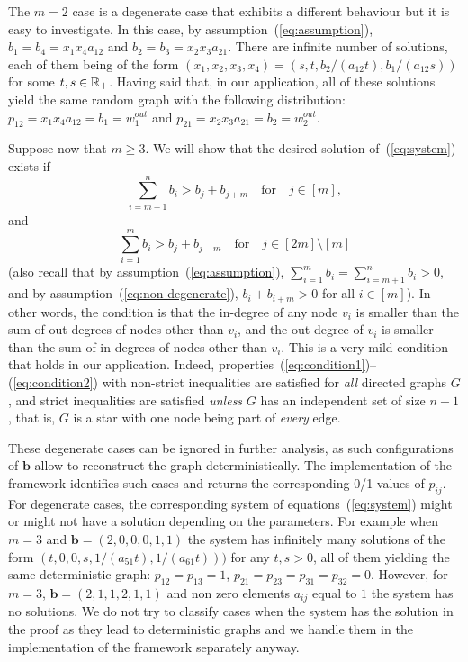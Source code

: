 \medskip

The $m=2$ case is a degenerate case that exhibits a different behaviour but it is easy to investigate. In this case, by assumption~(\ref{eq:assumption}), $b_1 = b_4 = x_1 x_4 a_{12}$ and $b_2 = b_3 = x_2 x_3 a_{21}$. There are infinite number of solutions, each of them being of the form $(x_1, x_2, x_3, x_4) = (s, t, b_2/(a_{12}t), b_1/(a_{12}s))$ for some $t, s \in {\mathbb R}_+$. Having said that, in our application, all of these solutions yield the same random graph with the following distribution: $p_{12} = x_1 x_4 a_{12} = b_1 = w^{out}_1$ and $p_{21} = x_2 x_3 a_{21} = b_2 = w^{out}_2$.

\medskip

Suppose now that $m \ge 3$. We will show that the desired solution of~(\ref{eq:system}) exists if
\begin{equation}\label{eq:condition1}
\sum_{i=m+1}^nb_i > b_j + b_{j+m} \quad \text{for} \quad j\in[m],
\end{equation}
and
\begin{equation}\label{eq:condition2}
\sum_{i=1}^mb_i > b_j + b_{j-m} \quad \text{for} \quad j\in[2m] \setminus [m]
\end{equation}
(also recall that by assumption~(\ref{eq:assumption}), $\sum_{i=1}^{m}b_i=\sum_{i=m+1}^{n}b_i>0$, and by assumption~(\ref{eq:non-degenerate}), $b_i+b_{i+m}>0$ for all $i \in [m]$).
In other words, the condition is that the in-degree of any node $v_i$ is smaller than the sum of out-degrees of nodes other than $v_i$, and the out-degree of $v_i$ is smaller than the sum of in-degrees of nodes other than $v_i$. This is a very mild condition that holds in our application. Indeed, properties~(\ref{eq:condition1})--(\ref{eq:condition2}) with non-strict inequalities are satisfied for \emph{all} directed graphs $G$, and strict inequalities are satisfied \emph{unless} $G$ has an independent set of size $n-1$, that is, $G$ is a star with one node being part of \emph{every} edge. 

These degenerate cases can be ignored in further analysis, as such configurations of $\mathbf{b}$ allow to reconstruct the graph deterministically. The implementation of the framework identifies such cases and returns the corresponding 0/1 values of $p_{ij}$. For degenerate cases, the corresponding system of equations~(\ref{eq:system}) might or might not have a solution depending on the parameters. For example when $m=3$ and $\mathbf{b}=(2,0,0,0,1,1)$ the system has infinitely many solutions of the form $(t,0,0,s,1/(a_{51}t), 1/(a_{61}t)))$ for any $t,s>0$, all of them yielding the same deterministic graph: $p_{12}=p_{13}=1$, $p_{21}=p_{23}=p_{31}=p_{32}=0$. However, for $m=3$, $\mathbf{b}=(2,1,1,2,1,1)$ and non zero elements $a_{ij}$ equal to $1$ the system has no solutions. We do not try to classify cases when the system has the solution in the proof as they lead to deterministic graphs and we handle them in the implementation of the framework separately anyway.

